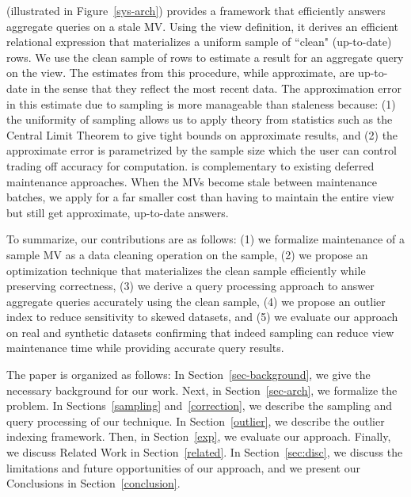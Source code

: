\svcfull (\svc illustrated in Figure~\ref{sys-arch}) provides a framework that efficiently answers aggregate queries on a stale MV.
Using the view definition, it derives an efficient relational expression that materializes a uniform sample of ``clean" (up-to-date) rows.
We use the clean sample of rows to estimate a result for an aggregate query on the view.
The estimates from this procedure, while approximate, are up-to-date in the sense that they reflect the most recent data. 
The approximation error in this estimate due to sampling is more manageable than staleness because: (1) the uniformity of sampling allows us to apply theory from statistics such as the Central Limit Theorem to give tight bounds on approximate results, and (2) the approximate error is parametrized by the sample size which the user can control trading off accuracy for computation.
\svc is complementary to existing deferred maintenance approaches.
When the MVs become stale between maintenance batches, we apply \svc for a far smaller cost than having to maintain the entire view but still get approximate, up-to-date answers.


To summarize, our contributions are as follows: (1) we formalize maintenance of a sample MV as a data cleaning operation on the sample, (2) we propose an optimization technique that materializes the clean sample efficiently while preserving correctness, (3) we derive a query processing approach to answer aggregate queries accurately using the clean sample, (4) we propose an outlier index to reduce sensitivity to skewed datasets, and (5) we evaluate our approach on real and synthetic datasets confirming that indeed sampling can reduce view maintenance time while providing accurate query results. 

The paper is organized as follows: 
In Section~\ref{sec-background}, we give the necessary background for our work.
Next, in Section~\ref{sec-arch}, we formalize the problem.
In Sections~\ref{sampling} and~\ref{correction}, we describe the sampling and query processing of our technique.
In Section~\ref{outlier}, we describe the outlier indexing framework.
Then, in Section~\ref{exp}, we evaluate our approach.
Finally, we discuss Related Work in Section~\ref{related}.
In Section~\ref{sec:disc}, we discuss the limitations and future opportunities of our approach, and we present our Conclusions in Section~\ref{conclusion}.
